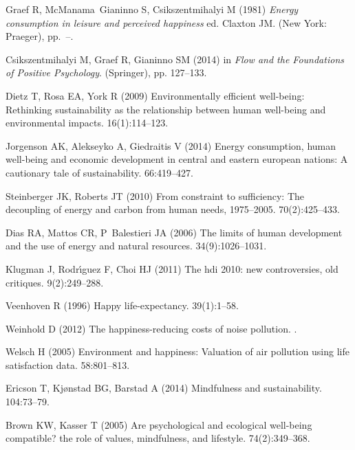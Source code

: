 \documentclass[10pt, letterpaper]{article}
\begin{document}
\begin{spacing}{1.4}
\begin{thebibliography}{10}
Graef R, McManama~Gianinno S, Csikszentmihalyi M (1981) {\em Energy consumption
  in leisure and perceived happiness} ed.{} Claxton JM.
\newblock (New York: Praeger), pp.~--.

Csikszentmihalyi M, Graef R, Gianinno SM (2014) in {\em Flow and the
  Foundations of Positive Psychology}.
\newblock (Springer), pp. 127--133.

Dietz T, Rosa EA, York R (2009) Environmentally efficient well-being:
  Rethinking sustainability as the relationship between human well-being and
  environmental impacts.
 16(1):114--123.

Jorgenson AK, Alekseyko A, Giedraitis V (2014) Energy consumption, human
  well-being and economic development in central and eastern european nations:
  A cautionary tale of sustainability.
 66:419--427.

Steinberger JK, Roberts JT (2010) From constraint to sufficiency: The
  decoupling of energy and carbon from human needs, 1975--2005.
 70(2):425--433.

Dias RA, Mattos CR, P~Balestieri JA (2006) The limits of human development and
  the use of energy and natural resources.
 34(9):1026--1031.

Klugman J, Rodr{\'\i}guez F, Choi HJ (2011) The hdi 2010: new controversies,
  old critiques.
 9(2):249--288.

Veenhoven R (1996) Happy life-expectancy.
 39(1):1--58.

Weinhold D (2012) The happiness-reducing costs of noise pollution.
.

Welsch H (2005) Environment and happiness: Valuation of air pollution using
  life satisfaction data.
 58:801--813.

Ericson T, Kj{\o}nstad BG, Barstad A (2014) Mindfulness and sustainability.
 104:73--79.

Brown KW, Kasser T (2005) Are psychological and ecological well-being
  compatible? the role of values, mindfulness, and lifestyle.
 74(2):349--368.


\end{thebibliography}
\end{spacing}
\end{document}
